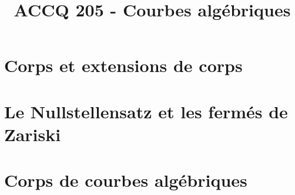 \documentclass[a4paper,9pt]{article}
\title{\vspace{-1.2cm} ACCQ 205 - Courbes algébriques}
\begin{document}
\maketitle

\vspace{-1.5cm}

\section{Corps et extensions de corps}
	

\section{Le Nullstellensatz et les fermés de Zariski}
	

\section{Corps de courbes algébriques}
	
\end{document}
